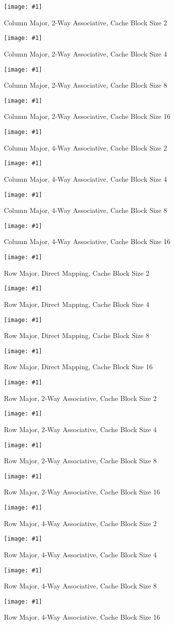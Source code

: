 \documentclass[11pt,a4paper]{article}
\newcommand{\cacheResultFigure}[3]{
\begin{figure}
	\centering
	\texttt{[image: \#1]}
	\caption{#2}
	\label{#3}
\end{figure}
}
\begin{document}
\cacheResultFigure{pictures/task4_columnMajor_2waySetAssociative2}{Column Major, 2-Way Associative, Cache Block Size 2}{fig:pic}
\cacheResultFigure{pictures/task4_columnMajor_2waySetAssociative4}{Column Major, 2-Way Associative, Cache Block Size 4}{fig:pic}
\cacheResultFigure{pictures/task4_columnMajor_2waySetAssociative8}{Column Major, 2-Way Associative, Cache Block Size 8}{fig:pic}
\cacheResultFigure{pictures/task4_columnMajor_2waySetAssociative16}{Column Major, 2-Way Associative, Cache Block Size 16}{fig:pic}

\cacheResultFigure{pictures/task4_columnMajor_4waySetAssociative2}{Column Major, 4-Way Associative, Cache Block Size 2}{fig:pic}
\cacheResultFigure{pictures/task4_columnMajor_4waySetAssociative4}{Column Major, 4-Way Associative, Cache Block Size 4}{fig:pic}
\cacheResultFigure{pictures/task4_columnMajor_4waySetAssociative8}{Column Major, 4-Way Associative, Cache Block Size 8}{fig:pic}
\cacheResultFigure{pictures/task4_columnMajor_4waySetAssociative16}{Column Major, 4-Way Associative, Cache Block Size 16}{fig:pic}


\cacheResultFigure{pictures/task4_rowMajor_directMapping2}{Row Major, Direct Mapping, Cache Block Size 2}{fig:pic}
\cacheResultFigure{pictures/task4_rowMajor_directMapping4}{Row Major, Direct Mapping, Cache Block Size 4}{fig:pic}
\cacheResultFigure{pictures/task4_rowMajor_directMapping8}{Row Major, Direct Mapping, Cache Block Size 8}{fig:pic}
\cacheResultFigure{pictures/task4_rowMajor_directMapping16}{Row Major, Direct Mapping, Cache Block Size 16}{fig:pic}

\cacheResultFigure{pictures/task4_rowMajor_2waySetAssociative2}{Row Major, 2-Way Associative, Cache Block Size 2}{fig:pic}
\cacheResultFigure{pictures/task4_rowMajor_2waySetAssociative4}{Row Major, 2-Way Associative, Cache Block Size 4}{fig:pic}
\cacheResultFigure{pictures/task4_rowMajor_2waySetAssociative8}{Row Major, 2-Way Associative, Cache Block Size 8}{fig:pic}
\cacheResultFigure{pictures/task4_rowMajor_2waySetAssociative16}{Row Major, 2-Way Associative, Cache Block Size 16}{fig:pic}

\cacheResultFigure{pictures/task4_rowMajor_4waySetAssociative2}{Row Major, 4-Way Associative, Cache Block Size 2}{fig:pic}
\cacheResultFigure{pictures/task4_rowMajor_4waySetAssociative4}{Row Major, 4-Way Associative, Cache Block Size 4}{fig:pic}
\cacheResultFigure{pictures/task4_rowMajor_4waySetAssociative8}{Row Major, 4-Way Associative, Cache Block Size 8}{fig:pic}
\cacheResultFigure{pictures/task4_rowMajor_4waySetAssociative16}{Row Major, 4-Way Associative, Cache Block Size 16}{fig:pic}






\newpage
\nocite{*}
\printbibliography

\end{document}
